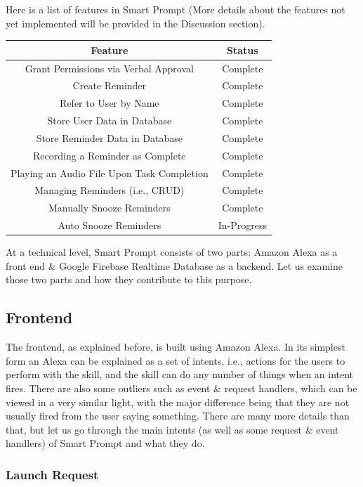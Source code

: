 \documentclass[11pt, oneside]{article}
\begin{document}
Here is a list of features in Smart Prompt (More details about the features not yet implemented will be provided in the Discussion section).
\begin{center}
\begin{tabular}{| c | c |}
 \hline
 Feature & Status \\ [0.5ex] 
 \hline\hline
 Grant Permissions via Verbal Approval & Complete \\
 \hline
 Create Reminder & Complete \\
 \hline
 Refer to User by Name & Complete \\
 \hline
 Store User Data in Database & Complete \\
 \hline
 Store Reminder Data in Database & Complete \\
 \hline
 Recording a Reminder as Complete & Complete \\
 \hline
 Playing an Audio File Upon Task Completion & Complete \\
 \hline
 Managing Reminders (i.e., CRUD) & Complete \\
 \hline
 Manually Snooze Reminders & Complete \\
 \hline
 Auto Snooze Reminders & In-Progress \\
 \hline
\end{tabular}
\end{center}

At a technical level, Smart Prompt consists of two parts: Amazon Alexa as a front end \& Google Firebase Realtime Database as a backend. 
Let us examine those two parts and how they contribute to this purpose. 

\subsection{Frontend}

The frontend, as explained before, is built using Amazon Alexa. 
In its simplest form an Alexa can be explained as a set of intents, i.e., actions for the users to perform with the skill, and the skill can do any number of things when an intent fires. 
There are also some outliers such as event \& request handlers, which can be viewed in a very similar light, with the major difference being that they are not usually fired from the user saying something. 
There are many more details than that, but let us go through the main intents (as well as some request \& event handlers) of Smart Prompt and what they do. 

\subsubsection{Launch Request}
\end{document}

